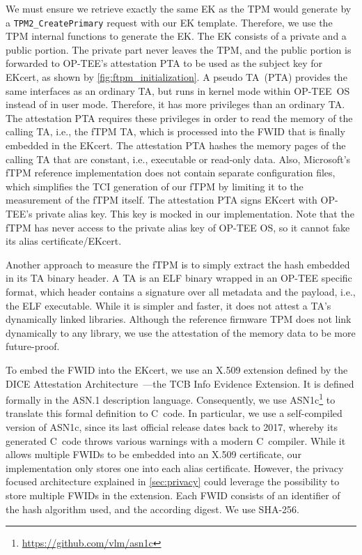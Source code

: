 We must ensure we retrieve exactly the same EK as the TPM would generate by a \texttt{TPM2\_CreatePrimary} request with our EK template.
Therefore, we use the TPM internal functions to generate the EK\@.
The EK consists of a private and a public portion.
The private part never leaves the TPM, and the public portion is forwarded to OP-TEE's attestation PTA to be used as the subject key for EKcert, as shown by \autoref{fig:ftpm_initialization}.
A pseudo \ac{TA}~(PTA) provides the same interfaces as an ordinary TA, but runs in kernel mode within OP-TEE~OS instead of in user mode.
Therefore, it has more privileges than an ordinary TA\@.
The attestation PTA requires these privileges in order to read the memory of the calling TA, i.e., the fTPM TA, which is processed into the FWID that is finally embedded in the EKcert.
The attestation PTA hashes the memory pages of the calling TA that are constant, i.e., executable or read-only data.
Also, Microsoft's fTPM reference implementation does not contain separate configuration files, which simplifies the TCI generation of our fTPM by limiting it to the measurement of the fTPM itself.
The attestation PTA signs EKcert with OP-TEE's private alias key.
This key is mocked in our implementation.
Note that the fTPM has never access to the private alias key of OP-TEE OS, so it cannot fake its alias certificate/EKcert.

Another approach to measure the fTPM is to simply extract the hash embedded in its TA binary header.
A TA is an ELF binary wrapped in an OP-TEE specific format, which header contains a signature over all metadata and the payload, i.e., the ELF executable.
While it is simpler and faster, it does not attest a TA's dynamically linked libraries.
Although the reference firmware TPM does not link dynamically to any library, we use the attestation of the memory data to be more future-proof.

To embed the FWID into the EKcert, we use an X.509 extension defined by the DICE Attestation Architecture~\cite{TCGAttestation2021}---the TCB Info Evidence Extension.
It is defined formally in the ASN.1 description language.
Consequently, we use ASN1c\footnote{\url{https://github.com/vlm/asn1c}} to translate this formal definition to C~code.
In particular, we use a self-compiled version of ASN1c, since its last official release dates back to 2017, whereby its generated C~code throws various warnings with a modern C~compiler.
While it allows multiple FWIDs to be embedded into an X.509 certificate, our implementation only stores one into each alias certificate.
However, the privacy focused architecture explained in \autoref{sec:privacy} could leverage the possibility to store multiple FWIDs in the extension.
Each FWID consists of an identifier of the hash algorithm used, and the according digest.
We use SHA-256.


